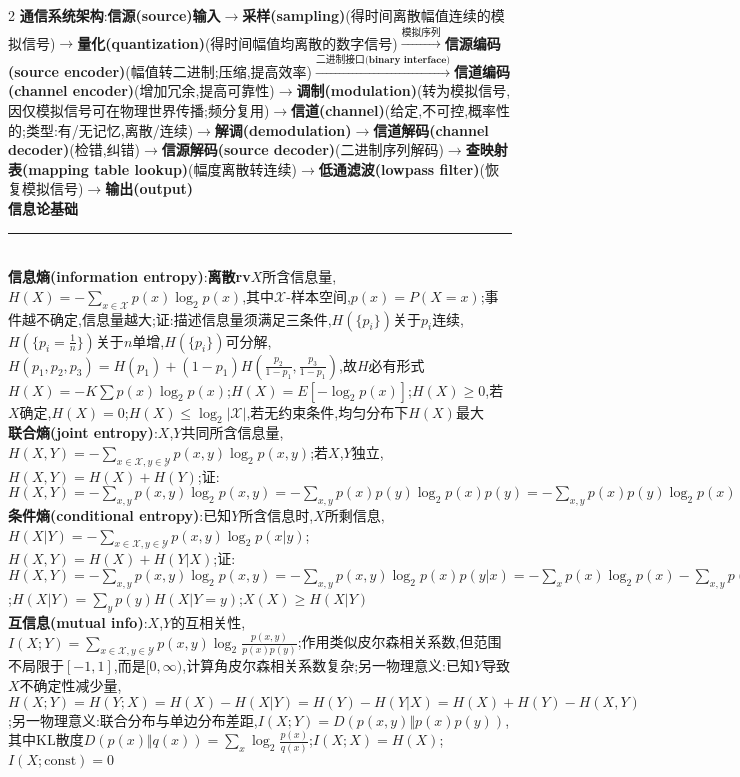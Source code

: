 \documentclass[UTF8,a4paper,10pt]{article}
\providecommand{\abs}[1]{\left\lvert#1\right\rvert}
\begin{document}
\scriptsize
\begin{multicols*}{2}
\noindent\textbf{通信系统架构}:\textbf{信源(source)输入}$\rightarrow$\textbf{采样(sampling)}(得时间离散幅值连续的模拟信号)$\rightarrow$\textbf{量化(quantization)}(得时间幅值均离散的数字信号)$\overset{\textbf{模拟序列}}{\longrightarrow}$\textbf{信源编码(source encoder)}(幅值转二进制;压缩,提高效率)$\overset{\textbf{二进制接口(binary interface)}}{\longrightarrow}$\textbf{信道编码(channel encoder)}(增加冗余,提高可靠性)$\rightarrow$\textbf{调制(modulation)}(转为模拟信号,因仅模拟信号可在物理世界传播;频分复用)$\rightarrow$\textbf{信道(channel)}(给定,不可控,概率性的;类型:有/无记忆,离散/连续)$\rightarrow$\textbf{解调(demodulation)}$\rightarrow$\textbf{信道解码(channel decoder)}(检错,纠错)$\rightarrow$\textbf{信源解码(source decoder)}(二进制序列解码)$\rightarrow$\textbf{查映射表(mapping table lookup)}(幅度离散转连续)$\rightarrow$\textbf{低通滤波(lowpass filter)}(恢复模拟信号)$\rightarrow$\textbf{输出(output)}\\
\textbf{信息论基础}\rule{\columnwidth-}{.2pt}\\
\textbf{信息熵(information entropy)}:\textbf{离散rv}$X$所含信息量,$H(X)=-\sum_{x\in\mathcal{X}}p(x)\log_2p(x)$,其中$\mathcal{X}$-样本空间,$p(x)=P(X=x)$;事件越不确定,信息量越大;证:描述信息量须满足三条件,$H(\{p_i\})$关于$p_i$连续,$H(\{p_i=\frac{1}{n}\})$关于$n$单增,$H(\{p_i\})$可分解,$H(p_1,p_2,p_3)=H(p_1)+(1-p_1)H(\frac{p_2}{1-p_1},\frac{p_3}{1-p_1})$,故$H$必有形式$H(X)=-K\sum p(x)\log_2p(x)$;$H(X)=E[-\log_2p(x)]$;$H(X)\geq 0$,若$X$确定,$H(X)=0$;$H(X)\leq\log_2\abs{\mathcal{X}}$,若无约束条件,均匀分布下$H(X)$最大\\
\textbf{联合熵(joint entropy)}:$X$,$Y$共同所含信息量,$H(X,Y)=-\sum_{x\in\mathcal{X},y\in\mathcal{Y}}p(x,y)\log_2p(x,y)$;若$X$,$Y$独立,$H(X,Y)=H(X)+H(Y)$;证:$H(X,Y)=-\sum_{x,y}p(x,y)\log_2p(x,y)=-\sum_{x,y}p(x)p(y)\log_2p(x)p(y)=-\sum_{x,y}p(x)p(y)\log_2p(x)-\sum_{x,y}p(x)p(y)\log_2p(y)=-\sum_xp(x)\log_2p(x)-\sum_yp(y)\log_2p(y)=H(X)+H(Y)$\\
\textbf{条件熵(conditional entropy)}:已知$Y$所含信息时,$X$所剩信息,$H(X\vert Y)=-\sum_{x\in\mathcal{X},y\in\mathcal{Y}}p(x,y)\log_2p(x\vert y)$;$H(X,Y)=H(X)+H(Y\vert X)$;证:$H(X,Y)=-\sum_{x,y}p(x,y)\log_2p(x,y)=-\sum_{x,y}p(x,y)\log_2p(x)p(y\vert x)=-\sum_xp(x)\log_2p(x)-\sum_{x,y}p(x,y)\log_2p(y\vert x)=H(X)+H(Y\vert X)$;$H(X\vert Y)=\sum_yp(y)H(X\vert Y=y)$;$X(X)\geq H(X\vert Y)$\\
\textbf{互信息(mutual info)}:$X$,$Y$的互相关性,$I(X;Y)=\sum_{x\in\mathcal{X},y\in\mathcal{Y}}p(x,y)\log_2\frac{p(x,y)}{p(x)p(y)}$;作用类似皮尔森相关系数,但范围不局限于$[-1,1]$,而是$[0,\infty)$,计算角皮尔森相关系数复杂;另一物理意义:已知$Y$导致$X$不确定性减少量,$H(X;Y)=H(Y;X)=H(X)-H(X\vert Y)=H(Y)-H(Y\vert X)=H(X)+H(Y)-H(X,Y)$;另一物理意义:联合分布与单边分布差距,$I(X;Y)=D(p(x,y)\Vert p(x)p(y))$,其中KL散度$D(p(x)\Vert q(x))=\sum_x\log_2\frac{p(x)}{q(x)}$;$I(X;X)=H(X)$;$I(X;\text{const})=0$\\

\end{multicols*}
\end{document}
